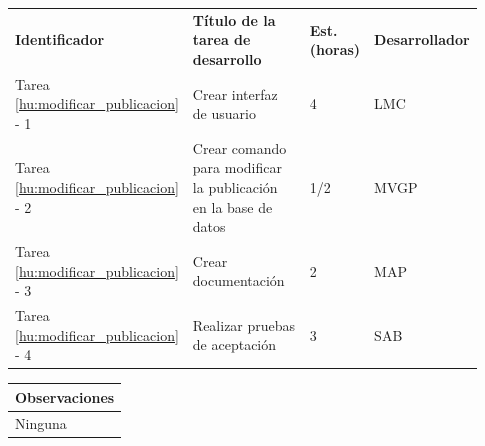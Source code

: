 \documentclass[11pt]{article}
\begin{document}
\vspace{-0.8cm}
\begin{longtable}{p{0.18\linewidth}|p{0.48\linewidth}|p{0.1\linewidth}|p{0.17\linewidth}}
  \toprule
  \textbf{Identificador} & \textbf{Título de la tarea de desarrollo} & \textbf{Est. (horas)} & \textbf{Desarrollador} \\
  Tarea \ref{hu:modificar_publicacion} - 1 & Crear interfaz de usuario & 4 & LMC\\
  Tarea \ref{hu:modificar_publicacion} - 2 & Crear comando para  modificar la publicación en la base de datos  & 1/2 & MVGP\\
  Tarea \ref{hu:modificar_publicacion} - 3 & Crear documentación & 2 & MAP\\
  Tarea \ref{hu:modificar_publicacion} - 4 & Realizar pruebas de aceptación & 3 & SAB \\
  \bottomrule
\end{longtable}
\vspace{-0.8cm}
\begin{longtable}{p{1.028\linewidth}}
  \textbf{Observaciones}\\
  \midrule
  Ninguna\\
  \bottomrule
\end{longtable}
\end{document}
